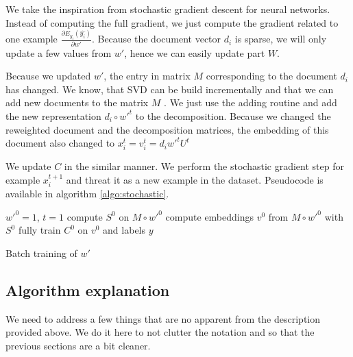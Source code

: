     We take the inspiration from stochastic gradient descent for neural networks.
    Instead of computing the full gradient, we just compute the gradient related to one example $\frac{\partial E_{y_i}(\hat{y_i})}{\partial w'}$.
    Because the document vector $d_i$ is sparse, we will only update a few values from $w'$, hence we can easily update part $W$.
    
    Because we updated $w'$, the entry in matrix $M$ corresponding to the document $d_i$ has changed.
    We know, that SVD can be build incrementally and that we can add new documents to the matrix $M$ \cite{brand2006fast}.
    We just use the adding routine and add the new representation $d_i \circ w'^{t}$ to the decomposition.
    Because we changed the reweighted document and the decomposition matrices,
    the embedding of this document also changed to 
    $x_i^{t} = v_i^{t} = d_i w'^{t} U^{t}$
    
    We update $C$ in the similar manner.
    We perform the stochastic gradient step for example $x_i^{t+1}$ and threat it as a new example in the dataset.
    Pseudocode is available in algorithm \ref{algo:stochastic}.
    
    \begin{algorithm}[H]
        $w'^0 = 1$, $t=1$\;
        compute $S^0$ on $M \circ w'^{0}$\;
        compute embeddings $v^0$ from $M \circ w'^{0}$ with $S^0$\;
        fully train $C^0$ on $v^0$ and labels $y$\;
        
        \caption{Batch training of $w'$} \label{algo:stochastic}
    \end{algorithm}
    
    
    \subsection{Algorithm explanation}
    We need to address a few things that are no apparent from the description provided above.
    We do it here to not clutter the notation and so that the previous sections are a bit cleaner. 
    
